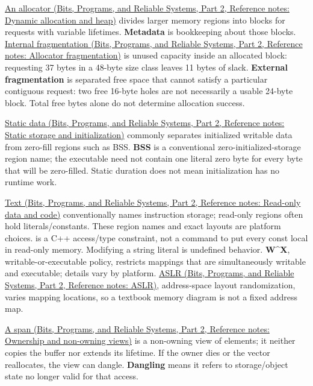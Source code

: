 \href{../01-Bits-Programs-and-Reliable-Systems-P02/main.pdf\#appendix-c3480f7d9ff3}{An allocator (Bits, Programs, and Reliable Systems, Part 2, Reference notes: Dynamic allocation and heap)} divides larger memory regions into blocks for requests with variable lifetimes. \textbf{Metadata} is bookkeeping about those blocks. \href{../01-Bits-Programs-and-Reliable-Systems-P02/main.pdf\#appendix-a7c50686d81f}{Internal fragmentation (Bits, Programs, and Reliable Systems, Part 2, Reference notes: Allocator fragmentation)} is unused capacity inside an allocated block: requesting 37 bytes in a 48-byte size class leaves 11 bytes of slack. \textbf{External fragmentation} is separated free space that cannot satisfy a particular contiguous request: two free 16-byte holes are not necessarily a usable 24-byte block. Total free bytes alone do not determine allocation success.

\href{../01-Bits-Programs-and-Reliable-Systems-P02/main.pdf\#appendix-17c93c4c2f19}{Static data (Bits, Programs, and Reliable Systems, Part 2, Reference notes: Static storage and initialization)} commonly separates initialized writable data from zero-fill regions such as BSS. \textbf{BSS} is a conventional zero-initialized-storage region name; the executable need not contain one literal zero byte for every byte that will be zero-filled. Static duration does not mean initialization has no runtime work.

\href{../01-Bits-Programs-and-Reliable-Systems-P02/main.pdf\#appendix-5f9e5e2f0a5e}{Text (Bits, Programs, and Reliable Systems, Part 2, Reference notes: Read-only data and code)} conventionally names instruction storage; read-only regions often hold literals/constants. These region names and exact layouts are platform choices.  is a C++ access/type constraint, not a command to put every const local in read-only memory. Modifying a string literal is undefined behavior. \textbf{W\^{}X}, writable-or-executable policy, restricts mappings that are simultaneously writable and executable; details vary by platform. \href{../01-Bits-Programs-and-Reliable-Systems-P02/main.pdf\#appendix-78cb248c8355}{ASLR (Bits, Programs, and Reliable Systems, Part 2, Reference notes: ASLR)}, address-space layout randomization, varies mapping locations, so a textbook memory diagram is not a fixed address map.

\href{../01-Bits-Programs-and-Reliable-Systems-P02/main.pdf\#appendix-d52e4486f527}{A span (Bits, Programs, and Reliable Systems, Part 2, Reference notes: Ownership and non-owning views)} is a non-owning view of elements; it neither copies the buffer nor extends its lifetime. If the owner dies or the vector reallocates, the view can dangle. \textbf{Dangling} means it refers to storage/object state no longer valid for that access.

